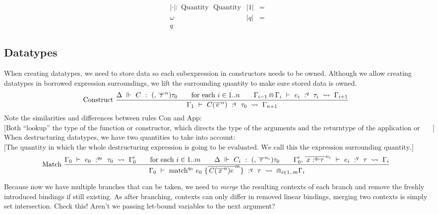 \[\begin{array}{lll}
{| \cdot |:\text{ Quantity }\text{ Quantity}} & |1| & = \\
\omega & |q| & = \\
q
\end{array}\]

\subsection{Datatypes}

When creating datatypes, we need to store data so each subexpression in
constructors needs to be owned. Although we allow creating datatypes in
borrowed expression surroundings, we lift the surrounding quantity to
make sure stored data is owned.
\[\text{Construct}\ \frac{{\Delta\  \Vdash \ C\ :\ {({,\ }{\overline{\,\tau\:}}^{n})\tau_{0}}}\text{\quad\quad}{\text{for each }i \in 1..n}\text{\quad\quad}{\Gamma_{i - 1} \Cap \Gamma_{i}\  \vdash \ e_{i}\ :^{q}\ \tau_{i}\  \rightsquigarrow \ \Gamma_{i + 1}}}{\Gamma_{1}\  \vdash \ {C({\overline{\, e\:}}^{n})}\ :^{q}\ \tau_{0}\  \rightsquigarrow \ \Gamma_{n + 1}}\ \]
Note the similarities and differences between rules \(\text{Con}\) and
\(\text{App}\):
\(\lbrack\text{Both “lookup” the type of the function or constructor,
which directs the type of the arguments and the returntype of the application or construction.}\rbrack\)When
destructuring datatypes, we have two quantities to take into account:
\(\lbrack\text{The quantity in which the whole destructuring expression is going to be evaluated.
We call this the }\text{expression surrounding quantity}.\rbrack\)\[\text{Match}\ \frac{{\Gamma_{0}\  \vdash \ e_{0}\ :^{q_{0}}\ \tau_{0}\  \rightsquigarrow \ \Gamma'_{0}}\text{\quad\quad}{\text{for each }i \in 1..m}\text{\quad\quad}{\Delta\  \Vdash \ C_{i}\ :\ {({,\ }{\overline{\,\tau\:}}^{n_{i}})\tau_{0}}}\text{\quad\quad}{\Gamma'_{0}{,\ }{\overline{\,{x\text{ :}^{q_{0}}\tau}\:}}^{n_{i}}\  \vdash \ e_{i}\ :^{q}\ \tau\  \rightsquigarrow \ \Gamma_{i}}}{\Gamma_{0}\  \vdash \ {\mathsf{\mathbf{\text{match}}}^{q_{0}}\ e_{0}\ \{{\overline{\,{C({\overline{\, x\:}}^{n})}e\:}}^{m}\}}\ :^{q}\ \tau\  \rightsquigarrow \  \Cap_{i \in 1..m}\Gamma_{i}}\ \]

Because now we have multiple branches that can be taken, we need to
\emph{merge} the resulting contexts of each branch and remove the
freshly introduced bindings if still existing. As after branching,
contexts can only differ in removed linear bindings, merging two
contexts is simply set intersection. Check this! Aren't we passing
let-bound variables to the next argument?

